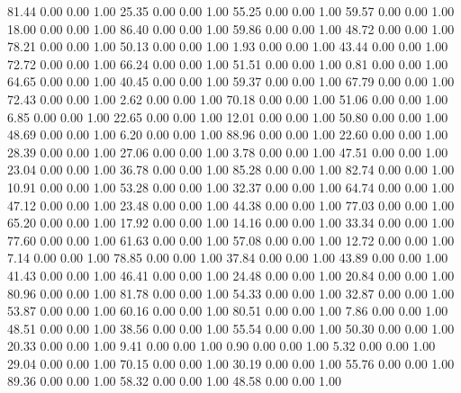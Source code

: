    81.44   0.00   0.00   1.00
   25.35   0.00   0.00   1.00
   55.25   0.00   0.00   1.00
   59.57   0.00   0.00   1.00
   18.00   0.00   0.00   1.00
   86.40   0.00   0.00   1.00
   59.86   0.00   0.00   1.00
   48.72   0.00   0.00   1.00
   78.21   0.00   0.00   1.00
   50.13   0.00   0.00   1.00
    1.93   0.00   0.00   1.00
   43.44   0.00   0.00   1.00
   72.72   0.00   0.00   1.00
   66.24   0.00   0.00   1.00
   51.51   0.00   0.00   1.00
    0.81   0.00   0.00   1.00
   64.65   0.00   0.00   1.00
   40.45   0.00   0.00   1.00
   59.37   0.00   0.00   1.00
   67.79   0.00   0.00   1.00
   72.43   0.00   0.00   1.00
    2.62   0.00   0.00   1.00
   70.18   0.00   0.00   1.00
   51.06   0.00   0.00   1.00
    6.85   0.00   0.00   1.00
   22.65   0.00   0.00   1.00
   12.01   0.00   0.00   1.00
   50.80   0.00   0.00   1.00
   48.69   0.00   0.00   1.00
    6.20   0.00   0.00   1.00
   88.96   0.00   0.00   1.00
   22.60   0.00   0.00   1.00
   28.39   0.00   0.00   1.00
   27.06   0.00   0.00   1.00
    3.78   0.00   0.00   1.00
   47.51   0.00   0.00   1.00
   23.04   0.00   0.00   1.00
   36.78   0.00   0.00   1.00
   85.28   0.00   0.00   1.00
   82.74   0.00   0.00   1.00
   10.91   0.00   0.00   1.00
   53.28   0.00   0.00   1.00
   32.37   0.00   0.00   1.00
   64.74   0.00   0.00   1.00
   47.12   0.00   0.00   1.00
   23.48   0.00   0.00   1.00
   44.38   0.00   0.00   1.00
   77.03   0.00   0.00   1.00
   65.20   0.00   0.00   1.00
   17.92   0.00   0.00   1.00
   14.16   0.00   0.00   1.00
   33.34   0.00   0.00   1.00
   77.60   0.00   0.00   1.00
   61.63   0.00   0.00   1.00
   57.08   0.00   0.00   1.00
   12.72   0.00   0.00   1.00
    7.14   0.00   0.00   1.00
   78.85   0.00   0.00   1.00
   37.84   0.00   0.00   1.00
   43.89   0.00   0.00   1.00
   41.43   0.00   0.00   1.00
   46.41   0.00   0.00   1.00
   24.48   0.00   0.00   1.00
   20.84   0.00   0.00   1.00
   80.96   0.00   0.00   1.00
   81.78   0.00   0.00   1.00
   54.33   0.00   0.00   1.00
   32.87   0.00   0.00   1.00
   53.87   0.00   0.00   1.00
   60.16   0.00   0.00   1.00
   80.51   0.00   0.00   1.00
    7.86   0.00   0.00   1.00
   48.51   0.00   0.00   1.00
   38.56   0.00   0.00   1.00
   55.54   0.00   0.00   1.00
   50.30   0.00   0.00   1.00
   20.33   0.00   0.00   1.00
    9.41   0.00   0.00   1.00
    0.90   0.00   0.00   1.00
    5.32   0.00   0.00   1.00
   29.04   0.00   0.00   1.00
   70.15   0.00   0.00   1.00
   30.19   0.00   0.00   1.00
   55.76   0.00   0.00   1.00
   89.36   0.00   0.00   1.00
   58.32   0.00   0.00   1.00
   48.58   0.00   0.00   1.00
